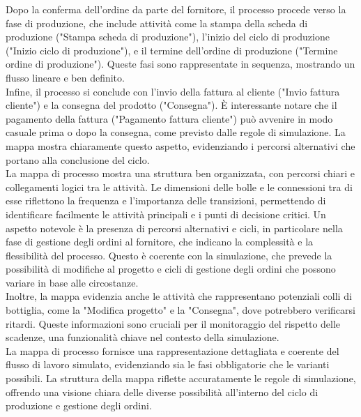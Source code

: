 \documentclass{article}
\begin{document}
Dopo la conferma dell'ordine da parte del fornitore, il processo procede verso la fase di produzione, che include attività come la stampa della scheda di produzione ("Stampa scheda di produzione"), l'inizio del ciclo di produzione ("Inizio ciclo di produzione"), e il termine dell'ordine di produzione ("Termine ordine di produzione"). Queste fasi sono rappresentate in sequenza, mostrando un flusso lineare e ben definito.\\
Infine, il processo si conclude con l'invio della fattura al cliente ("Invio fattura cliente") e la consegna del prodotto ("Consegna"). È interessante notare che il pagamento della fattura ("Pagamento fattura cliente") può avvenire in modo casuale prima o dopo la consegna, come previsto dalle regole di simulazione. La mappa mostra chiaramente questo aspetto, evidenziando i percorsi alternativi che portano alla conclusione del ciclo.\\
La mappa di processo mostra una struttura ben organizzata, con percorsi chiari e collegamenti logici tra le attività. Le dimensioni delle bolle e le connessioni tra di esse riflettono la frequenza e l'importanza delle transizioni, permettendo di identificare facilmente le attività principali e i punti di decisione critici.
Un aspetto notevole è la presenza di percorsi alternativi e cicli, in particolare nella fase di gestione degli ordini al fornitore, che indicano la complessità e la flessibilità del processo. Questo è coerente con la simulazione, che prevede la possibilità di modifiche al progetto e cicli di gestione degli ordini che possono variare in base alle circostanze.\\
Inoltre, la mappa evidenzia anche le attività che rappresentano potenziali colli di bottiglia, come la "Modifica progetto" e la "Consegna", dove potrebbero verificarsi ritardi. Queste informazioni sono cruciali per il monitoraggio del rispetto delle scadenze, una funzionalità chiave nel contesto della simulazione.\\
La mappa di processo fornisce una rappresentazione dettagliata e coerente del flusso di lavoro simulato, evidenziando sia le fasi obbligatorie che le varianti possibili. La struttura della mappa riflette accuratamente le regole di simulazione, offrendo una visione chiara delle diverse possibilità all'interno del ciclo di produzione e gestione degli ordini.
\end{document}
